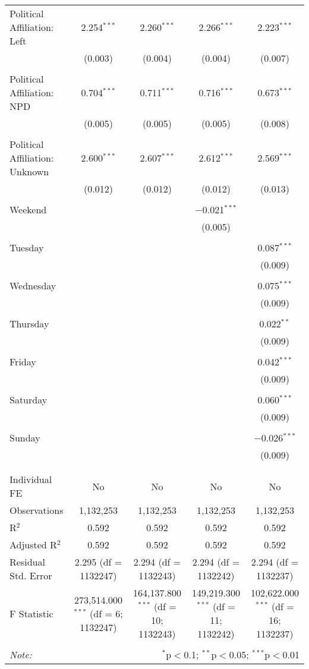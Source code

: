 \documentclass[
]{article}
\begin{document}
\begin{table}[!htbp]
{\begin{tabular}{@{\extracolsep{5pt}}lcccc}
 Political Affiliation: Left & 2.254$^{***}$ & 2.260$^{***}$ & 2.266$^{***}$ & 2.223$^{***}$ \\ 
  & (0.003) & (0.004) & (0.004) & (0.007) \\ 
  & & & & \\ 
 Political Affiliation: NPD & 0.704$^{***}$ & 0.711$^{***}$ & 0.716$^{***}$ & 0.673$^{***}$ \\ 
  & (0.005) & (0.005) & (0.005) & (0.008) \\ 
  & & & & \\ 
 Political Affiliation: Unknown & 2.600$^{***}$ & 2.607$^{***}$ & 2.612$^{***}$ & 2.569$^{***}$ \\ 
  & (0.012) & (0.012) & (0.012) & (0.013) \\ 
  & & & & \\ 
 Weekend &  &  & $-$0.021$^{***}$ &  \\ 
  &  &  & (0.005) &  \\ 
  & & & & \\ 
 Tuesday &  &  &  & 0.087$^{***}$ \\ 
  &  &  &  & (0.009) \\ 
  & & & & \\ 
 Wednesday &  &  &  & 0.075$^{***}$ \\ 
  &  &  &  & (0.009) \\ 
  & & & & \\ 
 Thursday &  &  &  & 0.022$^{**}$ \\ 
  &  &  &  & (0.009) \\ 
  & & & & \\ 
 Friday &  &  &  & 0.042$^{***}$ \\ 
  &  &  &  & (0.009) \\ 
  & & & & \\ 
 Saturday &  &  &  & 0.060$^{***}$ \\ 
  &  &  &  & (0.009) \\ 
  & & & & \\ 
 Sunday &  &  &  & $-$0.026$^{***}$ \\ 
  &  &  &  & (0.009) \\ 
  & & & & \\ 
\hline \\[-1.8ex] 
Individual FE & No & No & No & No \\ 
Observations & 1,132,253 & 1,132,253 & 1,132,253 & 1,132,253 \\ 
R$^{2}$ & 0.592 & 0.592 & 0.592 & 0.592 \\ 
Adjusted R$^{2}$ & 0.592 & 0.592 & 0.592 & 0.592 \\ 
Residual Std. Error & 2.295 (df = 1132247) & 2.294 (df = 1132243) & 2.294 (df = 1132242) & 2.294 (df = 1132237) \\ 
F Statistic & 273,514.000$^{***}$ (df = 6; 1132247) & 164,137.800$^{***}$ (df = 10; 1132243) & 149,219.300$^{***}$ (df = 11; 1132242) & 102,622.000$^{***}$ (df = 16; 1132237) \\ 
\hline 
\hline \\[-1.8ex] 
\textit{Note:}  & \multicolumn{4}{r}{$^{*}$p$<$0.1; $^{**}$p$<$0.05; $^{***}$p$<$0.01} \\ 
\end{tabular}
} 
\end{table} 
\newpage
\end{document}
